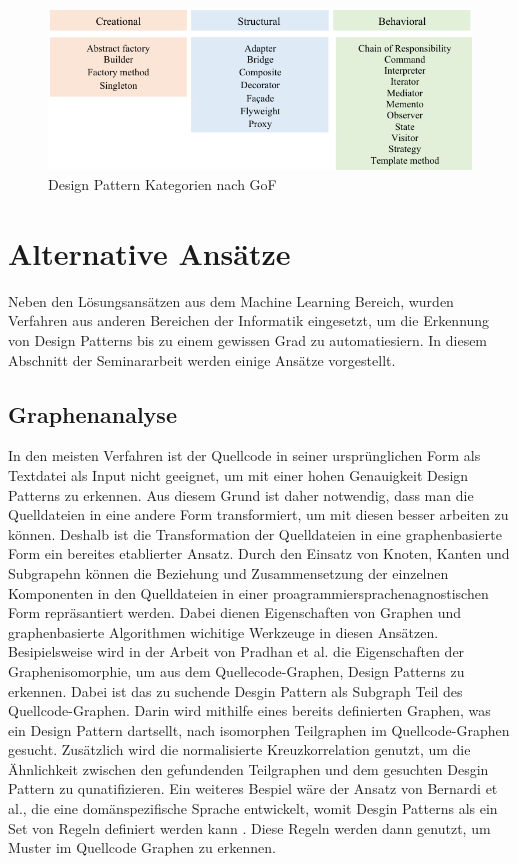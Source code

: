\documentclass[conference]{IEEEtran}
\begin{document}
\begin{figure}[h]
    \centering
    \includegraphics[width=\linewidth]{imgs/gof.png}
    \caption{Design Pattern Kategorien nach GoF}
\end{figure}


\newpage

\section{Alternative Ansätze}

Neben den Lösungsansätzen aus dem Machine Learning Bereich, wurden Verfahren aus anderen Bereichen der Informatik eingesetzt, um die Erkennung von Design Patterns bis zu einem gewissen Grad zu automatiesiern.
In diesem Abschnitt der Seminararbeit werden einige Ansätze vorgestellt.

\subsection{Graphenanalyse}

In den meisten Verfahren ist der Quellcode in seiner ursprünglichen Form als Textdatei als Input nicht geeignet, um mit einer hohen Genauigkeit Design Patterns zu erkennen.
Aus diesem Grund ist daher notwendig, dass man die Quelldateien in eine andere Form transformiert, um mit diesen besser arbeiten zu können. Deshalb ist die Transformation der Quelldateien in eine graphenbasierte Form ein bereites etablierter Ansatz.
Durch den Einsatz von Knoten, Kanten und Subgrapehn können die Beziehung und Zusammensetzung der einzelnen Komponenten in den Quelldateien in einer proagrammiersprachenagnostischen Form repräsantiert werden.
Dabei dienen Eigenschaften von Graphen und graphenbasierte Algorithmen wichitige Werkzeuge in diesen Ansätzen. Besipielsweise wird in der Arbeit von Pradhan et al. \cite{PradGraph} die Eigenschaften der Graphenisomorphie, um aus dem Quellecode-Graphen, Design Patterns zu erkennen.
Dabei ist das zu suchende Desgin Pattern als Subgraph Teil des Quellcode-Graphen. Darin wird mithilfe eines bereits definierten Graphen, was ein Design Pattern dartsellt, nach isomorphen Teilgraphen im Quellcode-Graphen gesucht.
Zusätzlich wird die normalisierte Kreuzkorrelation genutzt, um die Ähnlichkeit zwischen den gefundenden Teilgraphen und dem gesuchten Desgin Pattern zu qunatifizieren.
Ein weiteres Bespiel wäre der Ansatz von Bernardi et al., die eine domänspezifische Sprache entwickelt, womit Desgin Patterns als ein Set von Regeln definiert werden kann \cite{Bernardi2013AMG}. Diese Regeln werden dann genutzt, um Muster im Quellcode Graphen zu erkennen.
\end{document}
